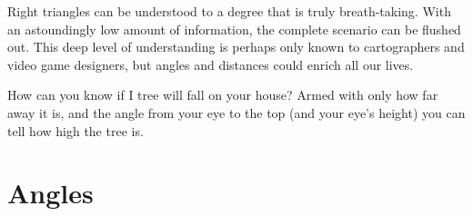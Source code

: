 

Right triangles can be understood to a degree that is truly breath-taking.  With an
astoundingly low amount of information, the complete scenario can be flushed out.
This deep level of understanding is perhaps only known to cartographers and 
video game designers, but angles and distances could enrich all our lives.

How can you know if I tree will fall on your house?  Armed with only how far away
it is, and the angle from your eye to the top (and your eye's height) you can tell
how high the tree is.

\newpage
\chapterminitoc

\newpage
\section{Angles}
\noindent{}

\newpage
